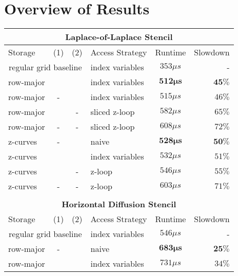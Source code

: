 \section{Overview of Results}

\begin{table}
	\begin{tabular}{l c c l c r} %
		\multicolumn{6}{c}{\textbf{Laplace-of-Laplace Stencil}} \\
		\hline
		\hline
		Storage & (1) & (2) & Access Strategy  & Runtime & Slowdown \\ %
		\hline 
		\multicolumn{3}{c}{regular grid baseline} & index variables & $353 \mu s$ & -\\
		\hline
		 row-major & \checkmark & \checkmark & index variables &  $\mathbf{512 \mu s}$ & $\mathbf{45 \%}$ \\
		 row-major & - & \checkmark & index variables & $515 \mu s$ & $46 \%$ \\
		 row-major & \checkmark & - & sliced z-loop & $582 \mu s$ & $65\%$ \\
		 row-major & - & - & sliced z-loop & $608 \mu s$ & $72 \%$ \\
		\hline
		 z-curves & - & \checkmark & naive & $\mathbf{528 \mu s}$ & $\mathbf{50 \%}$ \\
		 z-curves & \checkmark & \checkmark & index variables & $532 \mu s$ & $51 \%$ \\
		 z-curves & \checkmark & - &  z-loop & $546\mu s$ & $55 \%$ \\
		 z-curves & - & - & z-loop & $603 \mu s$ & $71 \%$ \\
		
		\hline
		\hline \\
		\multicolumn{6}{c}{\textbf{Horizontal Diffusion Stencil}} \\
		\hline
		\hline
		Storage & (1) & (2) & Access Strategy  & Runtime & Slowdown \\
		\hline
		\multicolumn{3}{c}{regular grid baseline} & index variables & $546 \mu s$ & - \\
		\hline
 		 row-major & - & \checkmark & naive & $\mathbf{683 \mu s}$ & $\mathbf{25 \%}$ \\
		
		 row-major & \checkmark & \checkmark & index variables & $731 \mu s$ & $34 \%$ \\
		

\end{tabular}
\end{table}
